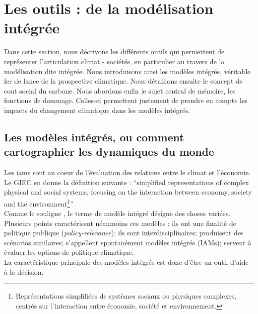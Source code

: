 \section{Les outils : de la modélisation intégrée}
\label{sect:1.3}

Dans cette section, nous décrivons les différents outils qui permettent de représenter l'articulation climat - sociétés, en particulier au travers de la modélisation dite intégrée. Nous introduisons ainsi les modèles intégrés, véritable fer de lance de la prospective climatique. Nous détaillons ensuite le concept de \gls{cout social du carbone}. Nous abordons enfin le sujet central de mémoire, les fonctions de dommage. Celles-ci permettent justement de prendre en compte les impacts du changement climatique dans les modèles intégrés. 

\subsection{Les modèles intégrés, ou comment cartographier les dynamiques du monde}
\label{sect:1.3.1}


Les \glspl{iam} sont au coeur de l'évaluation des relations entre le climat et l'économie. Le \Gls{GIEC} en donne la définition suivante : \enquote{{simplified representations of complex physical and social systems, focusing on the interaction between economy, society and the environment}\footnote{Représentations simplifiées de systèmes sociaux ou physiques complexes, centrés sur l'interaction entre économie, société et environnement.}}\\

Comme le souligne \textcite{cointe_organising_2019}, le terme de modèle intégré désigne des choses variées. Plusieurs points caractérisent néanmoins ces modèles : ils ont une finalité de politique publique (\emph{policy-relevance}); ils sont interdisciplinaires; produisent des scénarios similaires; s'appellent spontanément modèles intégrés (IAMs); servent à évaluer les options de politique climatique. \\

La caractéristique principale des modèles intégrés est donc d'être un outil d'aide à la décision. 

